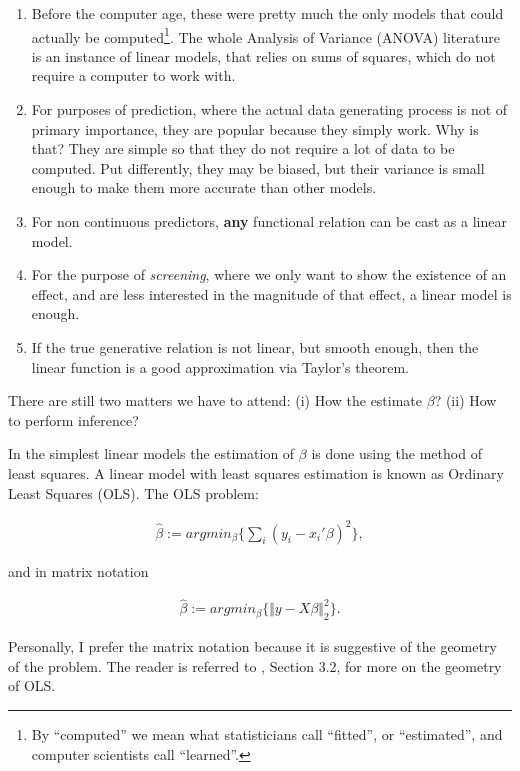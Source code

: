 \documentclass[]{book}
\theoremstyle{definition}
\theoremstyle{definition}
\theoremstyle{definition}
\theoremstyle{remark}
\let\BeginKnitrBlock\begin \let\EndKnitrBlock\end
\begin{document}
\begin{enumerate}
\def\labelenumi{\arabic{enumi}.}
\item
  Before the computer age, these were pretty much the only models that
  could actually be computed\footnote{By ``computed'' we mean what
    statisticians call ``fitted'', or ``estimated'', and computer
    scientists call ``learned''.}. The whole Analysis of Variance
  (ANOVA) literature is an instance of linear models, that relies on
  sums of squares, which do not require a computer to work with.
\item
  For purposes of prediction, where the actual data generating process
  is not of primary importance, they are popular because they simply
  work. Why is that? They are simple so that they do not require a lot
  of data to be computed. Put differently, they may be biased, but their
  variance is small enough to make them more accurate than other models.
\item
  For non continuous predictors, \textbf{any} functional relation can be
  cast as a linear model.
\item
  For the purpose of \emph{screening}, where we only want to show the
  existence of an effect, and are less interested in the magnitude of
  that effect, a linear model is enough.
\item
  If the true generative relation is not linear, but smooth enough, then
  the linear function is a good approximation via Taylor's theorem.
\end{enumerate}

There are still two matters we have to attend: (i) How the estimate
\(\beta\)? (ii) How to perform inference?

In the simplest linear models the estimation of \(\beta\) is done using
the method of least squares. A linear model with least squares
estimation is known as Ordinary Least Squares (OLS). The OLS problem:

\begin{align}
  \hat \beta:= argmin_\beta \{ \sum_i (y_i-x_i'\beta)^2 \},
  \label{eq:ols}
\end{align}

and in matrix notation

\begin{align}
  \hat \beta:= argmin_\beta \{ \Vert y-X\beta \Vert^2_2 \}.
  \label{eq:ols-matrix}
\end{align}

\BeginKnitrBlock{remark}
{}Personally, I prefer the matrix notation
because it is suggestive of the geometry of the problem. The reader is
referred to \citet{friedman2001elements}, Section 3.2, for more on the
geometry of OLS.
\EndKnitrBlock{remark}
\end{document}
